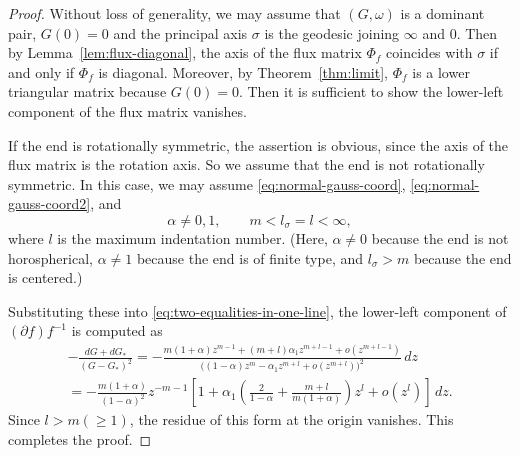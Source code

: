 \documentclass[a4paper]{amsart}
\theoremstyle{plain}
\theoremstyle{remark}
\numberwithin{equation}{section}
\begin{document}
\begin{proof}
 Without loss of generality, we may assume that
 $(G,\omega)$ is a dominant pair,
 $G(0)=0$ and  the principal axis $\sigma$
 is the geodesic joining $\infty$ and $0$.
 Then by Lemma~\ref{lem:flux-diagonal},
 the axis of the flux matrix $\Phi_f$ 
 coincides with $\sigma$ if and only if $\Phi_f$ is diagonal.
 Moreover, by Theorem~\ref{thm:limit}, 
 $\Phi_f$ is a lower triangular matrix because $G(0)=0$.
 Then it is sufficient to show the lower-left component
 of the flux matrix vanishes.

 If the end is rotationally symmetric, 
 the assertion is obvious, since 
 the axis of the flux matrix is the rotation axis.
 So we assume that the end is not rotationally symmetric.
 In this case, 
 we may assume
 \eqref{eq:normal-gauss-coord},
 \eqref{eq:normal-gauss-coord2},
 and
 \[
    \alpha\neq 0,1,\qquad m<l_{\sigma}=l<\infty,
 \]
 where $l$ is the maximum indentation number.
 (Here, $\alpha\neq 0$ because the end is not horospherical,
 $\alpha\neq 1$ because the end is of finite type,
 and $l_{\sigma}>m$ because the end is centered.)

 Substituting these into \eqref{eq:two-equalities-in-one-line},
 the lower-left component of $(\partial f)f^{-1}$ is computed as
 \begin{multline*}
  -\frac{dG+dG_*}{(G-G_*)^2} =
      -\frac{m(1+\alpha)z^{m-1}+(m+l)\alpha_1z^{m+l-1}+o(z^{m+l-1})}{            \bigl((1-\alpha)z^m-\alpha_1z^{m+l}+o(z^{m+l})\bigr)^2}
            \,dz\\
      =
      -\frac{m(1+\alpha)}{(1-\alpha)^2}z^{-m-1}
      \left[1+
        \alpha_1\left(\frac{2}{1-\alpha}+\frac{m+l}{m(1+\alpha)}
  \right)
        z^l + o (z^l)\right]\,dz.
 \end{multline*}
 Since $l>m(\ge 1)$, the residue of this form at the origin vanishes.
 This completes the proof.
\end{proof}
\end{document}
